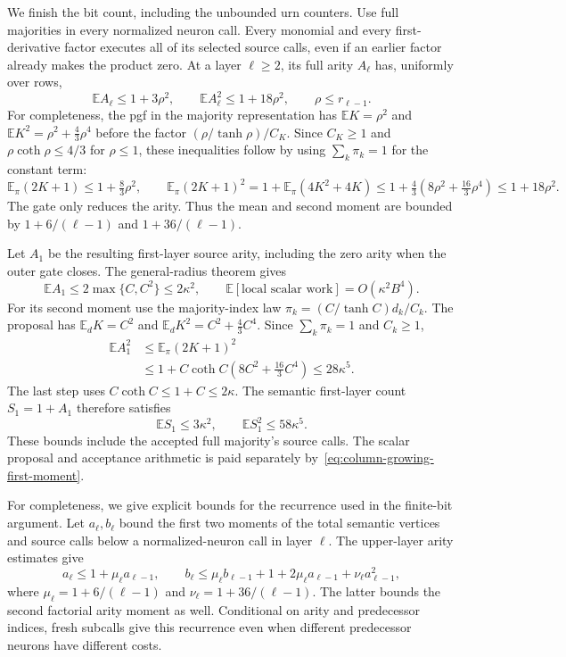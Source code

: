 We finish the bit count, including the unbounded urn counters.
Use full majorities in every normalized neuron call.  Every monomial
and every first-derivative factor executes all of its selected source
calls, even if an earlier factor already makes the product zero.  At a layer $\ell\ge2$, its full arity $A_\ell$
has, uniformly over rows,
\[
 \mathbb E A_\ell\le1+3\rho^2,
 \qquad \mathbb E A_\ell^2\le1+18\rho^2,
 \qquad \rho\le r_{\ell-1}.
\]
For completeness, the pgf in the majority representation has
$\mathbb E K=\rho^2$ and
$\mathbb E K^2=\rho^2+\tfrac43\rho^4$ before the factor
$(\rho/\tanh\rho)/C_K$.  Since $C_K\ge1$ and
$\rho\coth\rho\le4/3$ for $\rho\le1$, these inequalities
follow by using $\sum_k\pi_k=1$ for the constant term:
\[
 \mathbb E_\pi(2K+1)\le1+\tfrac83\rho^2,\qquad
 \mathbb E_\pi(2K+1)^2
 =1+\mathbb E_\pi(4K^2+4K)
 \le1+\tfrac43(8\rho^2+\tfrac{16}3\rho^4)
 \le1+18\rho^2.
\]
The gate only reduces the arity.
Thus the mean and second moment are bounded by
$1+6/(\ell-1)$ and $1+36/(\ell-1)$.

Let $A_1$ be the resulting first-layer source arity, including the
zero arity when the outer gate closes.  The general-radius theorem
gives
\begin{equation}
 \mathbb E A_1\le2\max\{C,C^2\}\le2\kappa^2,\qquad
 \mathbb E[\text{local scalar work}]=O(\kappa^2B^4).
 \label{eq:column-growing-first-moment}
\end{equation}
For its second moment use the majority-index law
$\pi_k=(C/\tanh C)d_k/C_k$.  The proposal has
$\mathbb E_dK=C^2$ and
$\mathbb E_dK^2=C^2+\frac43C^4$.  Since
$\sum_k\pi_k=1$ and $C_k\ge1$,
\begin{align}
 \mathbb E A_1^2
 &\le \mathbb E_\pi(2K+1)^2 \nonumber\\
 &\le1+C\coth C\left(8C^2+\frac{16}3C^4\right)
 \le28\kappa^5.
 \label{eq:column-growing-second-moment}
\end{align}
The last step uses $C\coth C\le1+C\le2\kappa$.
The semantic first-layer count $S_1=1+A_1$ therefore satisfies
\[
 \mathbb E S_1\le3\kappa^2,\qquad
 \mathbb E S_1^2\le58\kappa^5.
\]
These bounds include the accepted full majority's source calls.
The scalar proposal and acceptance arithmetic is paid separately
by~\eqref{eq:column-growing-first-moment}.

For completeness, we give explicit bounds for the recurrence used
in the finite-bit argument.  Let $a_\ell,b_\ell$ bound the first two
moments of the total semantic vertices and source calls below a
normalized-neuron call in layer $\ell$.  The upper-layer arity
estimates give
\[
 a_\ell\le1+\mu_\ell a_{\ell-1},\qquad
 b_\ell\le\mu_\ell b_{\ell-1}
       +1+2\mu_\ell a_{\ell-1}+\nu_\ell a_{\ell-1}^2,
\]
where $\mu_\ell=1+6/(\ell-1)$ and
$\nu_\ell=1+36/(\ell-1)$.  The latter bounds the second factorial
arity moment as well.  Conditional on arity and predecessor
indices, fresh subcalls give this recurrence even when different
predecessor neurons have different costs.

